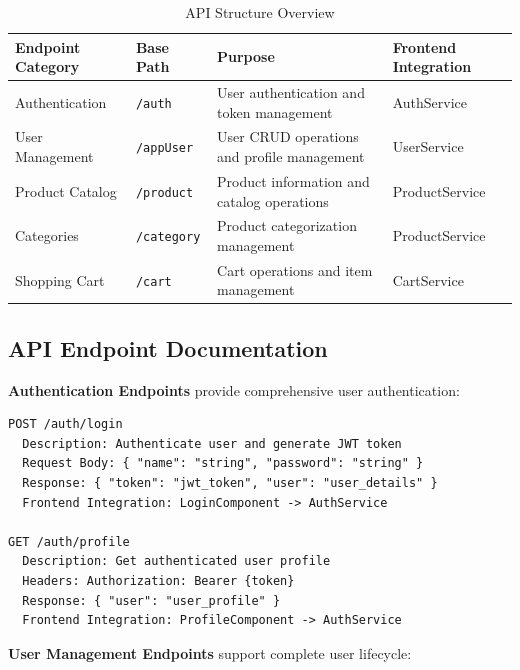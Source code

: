 \documentclass[12pt,a4paper]{article}
\begin{document}
\begin{table}[h!]
    \centering
    \begin{tabular}{@{}p{3cm}p{2.5cm}p{4.5cm}p{3.5cm}@{}}
        \toprule
        \textbf{Endpoint Category} & \textbf{Base Path} & \textbf{Purpose}                            & \textbf{Frontend Integration} \\
        \midrule
        Authentication             & \texttt{/auth}     & User authentication and token management    & AuthService                   \\
        User Management            & \texttt{/appUser}  & User CRUD operations and profile management & UserService                   \\
        Product Catalog            & \texttt{/product}  & Product information and catalog operations  & ProductService                \\
        Categories                 & \texttt{/category} & Product categorization management           & ProductService                \\
        Shopping Cart              & \texttt{/cart}     & Cart operations and item management         & CartService                   \\
        \bottomrule
    \end{tabular}
    \caption{API Structure Overview}
\end{table}

\subsection{API Endpoint Documentation}

\textbf{Authentication Endpoints} provide comprehensive user authentication:

\begin{lstlisting}[caption=Authentication API Endpoints]
POST /auth/login
  Description: Authenticate user and generate JWT token
  Request Body: { "name": "string", "password": "string" }
  Response: { "token": "jwt_token", "user": "user_details" }
  Frontend Integration: LoginComponent -> AuthService

GET /auth/profile
  Description: Get authenticated user profile
  Headers: Authorization: Bearer {token}
  Response: { "user": "user_profile" }
  Frontend Integration: ProfileComponent -> AuthService
\end{lstlisting}

\textbf{User Management Endpoints} support complete user lifecycle:
\end{document}

